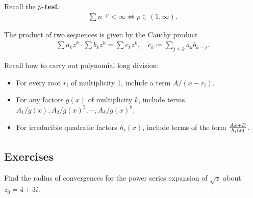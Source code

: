 \begin{fact}

Recall the \textbf{\(p{\hbox{-}}\)test}:
\begin{align*}
\sum n^{-p} < \infty \iff p \in (1, \infty)
.\end{align*}

\end{fact}

\begin{fact}

The product of two sequences is given by the Cauchy product
\begin{align*}
\sum a_kz^k \cdot \sum b_k z^k = \sum c_k z^k,\quad c_k \coloneqq\sum_{j\leq k} a_k b_{k-j}
.\end{align*}

\end{fact}

\begin{fact}

Recall how to carry out polynomial long division:


\end{fact}

\begin{fact}

\envlist

\begin{itemize}
\tightlist
\item
  For every root \(r_i\) of multiplicity 1, include a term
  \(A/(x-r_i)\).
\item
  For any factors \(g(x)\) of multiplicity \(k\), include terms
  \(A_1/g(x), A_2/g(x)^2, \cdots, A_k / g(x)^k\).
\item
  For irreducible quadratic factors \(h_i(x)\), include terms of the
  form \({Ax+B \over h_i(x)}\).
\end{itemize}

\end{fact}

\hypertarget{exercises}{%
\subsection{Exercises}\label{exercises}}

\begin{exercise}[?]

Find the radius of convergences for the power series expansion of
\(\sqrt{z}\) about \(z_0 = 4 +3i\).

\end{exercise}

